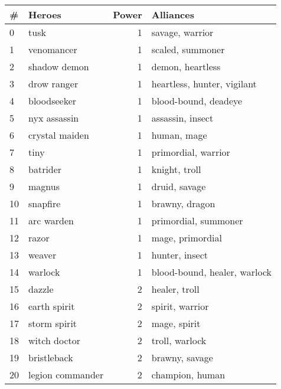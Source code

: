 \documentclass[smallextended]{svjour3}       %
\begin{document}
\begin{table}
\center
\resizebox{!}{9cm} {
\begin{tabular}{llrl}
{\#} &                 Heroes &  Power &                       Alliances \\
\midrule
0  &                 tusk &      1 &               savage, warrior  \\
1  &           venomancer &      1 &               scaled, summoner \\
2  &         shadow demon &      1 &               demon, heartless \\
3  &          drow ranger &      1 &    heartless, hunter, vigilant \\
4  &          bloodseeker &      1 &           blood-bound, deadeye \\
5  &         nyx assassin &      1 &               assassin, insect \\
6  &       crystal maiden &      1 &                    human, mage \\
7  &                 tiny &      1 &           primordial, warrior  \\
8  &             batrider &      1 &                  knight, troll \\
9  &               magnus &      1 &                  druid, savage \\
10 &             snapfire &      1 &                 brawny, dragon \\
11 &           arc warden &      1 &           primordial, summoner \\
12 &                razor &      1 &               mage, primordial \\
13 &               weaver &      1 &                 hunter, insect \\
14 &              warlock &      1 &  blood-bound, healer, warlock  \\
15 &               dazzle &      2 &                  healer, troll \\
16 &         earth spirit &      2 &               spirit, warrior  \\
17 &         storm spirit &      2 &                   mage, spirit \\
18 &         witch doctor &      2 &                troll, warlock  \\
19 &          bristleback &      2 &                 brawny, savage \\
20 &     legion commander &      2 &                champion, human \\

\end{tabular}}
\end{table}
\end{document}
